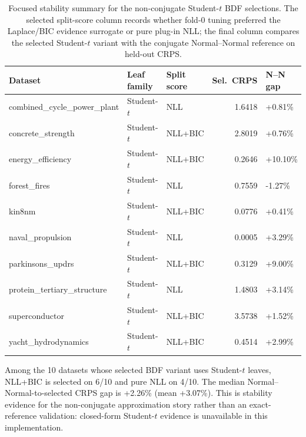 \begin{table}[htbp]
\centering
\caption{Focused stability summary for the non-conjugate Student-$t$ BDF selections. The selected split-score column records whether fold-0 tuning preferred the Laplace/BIC evidence surrogate or pure plug-in NLL; the final column compares the selected Student-$t$ variant with the conjugate Normal--Normal reference on held-out CRPS.}
\label{tab:bdf-student-t-stability}
\begin{tabular}{lllrl}
\toprule
Dataset & Leaf family & Split score & Sel.\ CRPS & N--N gap \\
\midrule
combined\_cycle\_power\_plant & Student-$t$ & NLL & 1.6418 & +0.81\% \\
concrete\_strength & Student-$t$ & NLL+BIC & 2.8019 & +0.76\% \\
energy\_efficiency & Student-$t$ & NLL+BIC & 0.2646 & +10.10\% \\
forest\_fires & Student-$t$ & NLL & 0.7559 & -1.27\% \\
kin8nm & Student-$t$ & NLL+BIC & 0.0776 & +0.41\% \\
naval\_propulsion & Student-$t$ & NLL & 0.0005 & +3.29\% \\
parkinsons\_updrs & Student-$t$ & NLL+BIC & 0.3129 & +9.00\% \\
protein\_tertiary\_structure & Student-$t$ & NLL & 1.4803 & +3.14\% \\
superconductor & Student-$t$ & NLL+BIC & 3.5738 & +1.52\% \\
yacht\_hydrodynamics & Student-$t$ & NLL+BIC & 0.4514 & +2.99\% \\
\bottomrule
\end{tabular}
\par\smallskip\footnotesize{Among the 10 datasets whose selected BDF variant uses Student-$t$ leaves, NLL+BIC is selected on 6/10 and pure NLL on 4/10. The median Normal--Normal-to-selected CRPS gap is +2.26\% (mean +3.07\%). This is stability evidence for the non-conjugate approximation story rather than an exact-reference validation: closed-form Student-$t$ evidence is unavailable in this implementation.}
\end{table}
